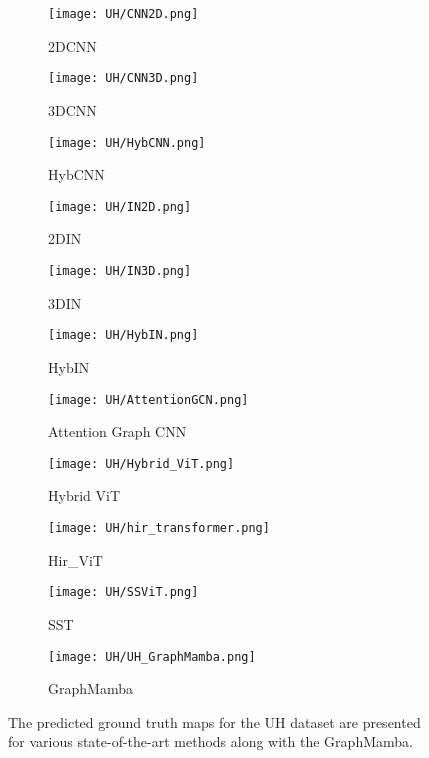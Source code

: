 \documentclass[journal]{IEEEtran}
\begin{document}
\begin{figure*}[!htb]
    \centering
        \begin{subfigure}{0.48\textwidth}
            \texttt{[image: UH/CNN2D.png]}
            \caption{2DCNN}
        \end{subfigure}
        \begin{subfigure}{0.48\textwidth}
            \centering
            \texttt{[image: UH/CNN3D.png]}
            \caption{3DCNN}
        \end{subfigure}
        \begin{subfigure}{0.48\textwidth}
            \centering
            \texttt{[image: UH/HybCNN.png]}
            \caption{HybCNN}
        \end{subfigure}
        \begin{subfigure}{0.48\textwidth}
            \texttt{[image: UH/IN2D.png]}
            \caption{2DIN}
        \end{subfigure}
        \begin{subfigure}{0.48\textwidth}
            \centering
            \texttt{[image: UH/IN3D.png]}
            \caption{3DIN}
        \end{subfigure}
        \begin{subfigure}{0.48\textwidth}
            \centering
            \texttt{[image: UH/HybIN.png]}
            \caption{HybIN}
        \end{subfigure}
        \begin{subfigure}{0.48\textwidth}
            \centering
            \texttt{[image: UH/AttentionGCN.png]}
            \caption{Attention Graph CNN}
        \end{subfigure}
        \begin{subfigure}{0.48\textwidth}
            \centering
            \texttt{[image: UH/Hybrid\_ViT.png]}
            \caption{Hybrid ViT}
        \end{subfigure}
        \begin{subfigure}{0.48\textwidth}
            \centering
            \texttt{[image: UH/hir\_transformer.png]}
            \caption{Hir\_ViT}
        \end{subfigure}
        \begin{subfigure}{0.48\textwidth}
            \centering
            \texttt{[image: UH/SSViT.png]}
            \caption{SST}
        \end{subfigure}
        \begin{subfigure}{0.48\textwidth}
            \centering
            \texttt{[image: UH/UH\_GraphMamba.png]}
            \caption{GraphMamba}
        \end{subfigure}
    \caption{The predicted ground truth maps for the UH dataset are presented for various state-of-the-art methods along with the GraphMamba.}
    \label{fig:UH_results}
\end{figure*}
\end{document}
